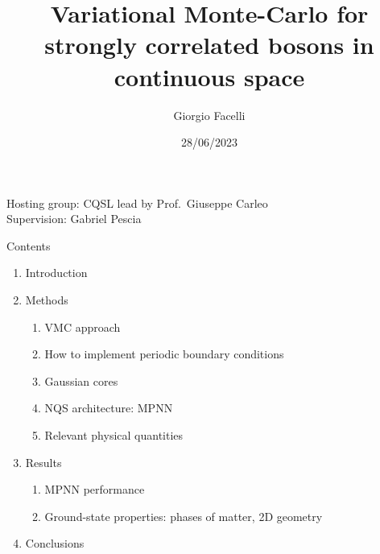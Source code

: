 \documentclass{beamer}
\title{Variational Monte-Carlo for strongly correlated bosons in continuous space}
\author{Giorgio Facelli}
\date{28/06/2023}
\begin{document}
\begin{frame}[plain]
    \titlepage
    \begin{center}
      Hosting group: CQSL lead by Prof.\ Giuseppe Carleo \\
      Supervision: Gabriel Pescia
      \end{center}
\end{frame}

\begin{frame}{Contents}
  \begin{enumerate}
    \item \large Introduction
    \item \large Methods
    \begin{enumerate}[I]
      \item VMC approach
      \item How to implement periodic boundary conditions
      \item Gaussian cores
      \item NQS architecture: MPNN
      \item Relevant physical quantities
    \end{enumerate} 
    \item \large Results
    \begin{enumerate}[I]
      \item MPNN performance
      \item Ground-state properties: phases of matter, 2D geometry
    \end{enumerate}
    \item \large Conclusions
  \end{enumerate}
\end{frame}

\end{document}
